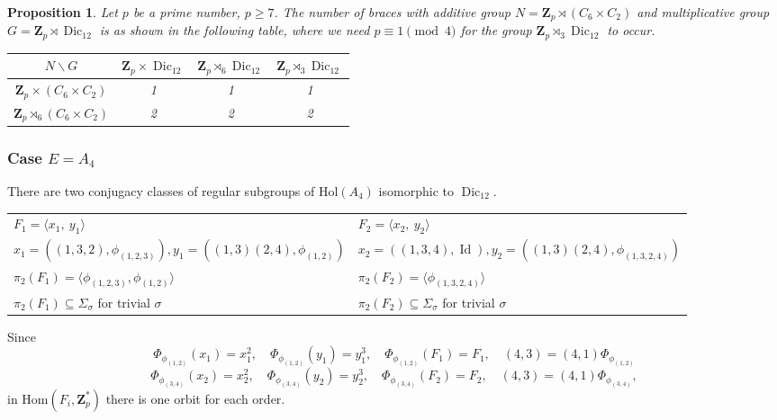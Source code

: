 \documentclass[12pt]{article}
\newtheorem{proposition}[theorem]{Proposition}
\theoremstyle{definition}
\newcommand{\Z}{\mathbf Z}
\newcommand{\Hol}{\mathrm{Hol}}
\newcommand{\Hom}{\mathrm{Hom}}
\newcommand{\Id}{\operatorname{Id}}
\newcommand{\Dic}{\operatorname{Dic}}
\begin{document}
\begin{proposition}
	Let $p$ be a prime number, $p\geq 7$. The number of braces with additive group $N=\Z_p \rtimes (C_{6}\times C_2)$ and multiplicative group $G=\Z_p\rtimes \Dic_{12}$ is as shown in the following table, where we need $p\equiv 1 \pmod{4}$ for the group  $\Z_p\rtimes_{3} \Dic_{12}$ to occur.
	
	\begin{center}
		\begin{tabular}{|c||c|c|c|}
			\hline
			$N \backslash G$ & $\Z_p\times \Dic_{12}$ & $\Z_p\rtimes_{6} \Dic_{12}$ & $\Z_p\rtimes_{3} \Dic_{12}$  \\
			\hline
			\hline
			$\Z_p \times (C_{6}\times C_2)$ &1&1&1\\
			\hline
			$\Z_p \rtimes_{6} (C_{6}\times C_2)$ &2&2&2\\
			\hline
			
		\end{tabular}
	\end{center}
	
\end{proposition}


\subsubsection*{Case $E=A_4$}

There are two  conjugacy classes of regular subgroups of $\Hol(A_4)$ isomorphic to $\Dic_{12}$.  



\begin{center}
    \begin{tabular}{|l|l|}
    \hline
      $F_1=\langle x_1,\ y_1\rangle $ &
     $F_2=\langle x_2, \ y_2\rangle$\\
     $x_1=((1,3,2),\phi_{(1,2,3)}),y_1=((1,3)(2,4),\phi_{(1,2)})$&
     $ x_2=((1,3,4),\Id), y_2=((1,3)(2,4),\phi_{(1,3,2,4)})$\\\hline
      $\pi_2(F_1)=\langle \phi_{(1,2,3)},\phi_{(1,2)}\rangle$ & $\pi_2(F_2)=\langle \phi_{(1,3,2,4)} \rangle $  \\
      $\pi_2(F_1)\subseteq \Sigma_{\sigma}$ for trivial  $\sigma$&
      $\pi_2(F_2)\subseteq \Sigma_{\sigma}$ for trivial  $\sigma$\\
      \hline
    \end{tabular}
\end{center}    


Since
$$\Phi_{\phi_{(1,2)}}(x_1)=x_1^2,\quad \Phi_{\phi_{(1,2)}}(y_1)=y_1^3,\quad \Phi_{\phi_{(1,2)}}(F_1)=F_1,\quad (4,3)=(4,1)\Phi_{\phi_{(1,2)}} $$
$$\Phi_{\phi_{(3,4)}}(x_2)=x_2^2,\quad \Phi_{\phi_{(3,4)}}(y_2)=y_2^3,
\quad\Phi_{\phi_{(3,4)}}(F_2)=F_2, \quad (4,3)=(4,1)\Phi_{\phi_{(3,4)}},$$
in $\Hom(F_i,\Z_p^*)$ there is one orbit for each order.
\end{document}
